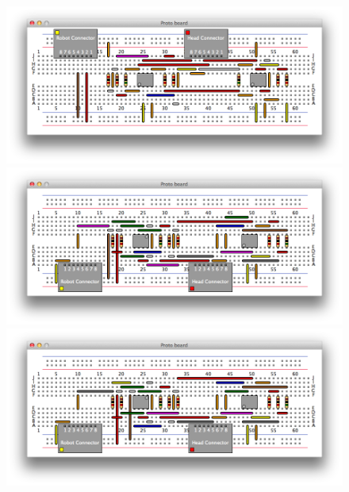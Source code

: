 \begin{figure}
\begin{center}
\includegraphics[width=\textwidth]{Images/exemplar_all_pairs.png}
\includegraphics[width=\textwidth]{Images/exemplar_per_node_increasing.png}
\includegraphics[width=\textwidth]{Images/exemplar_per_node_decreasing.png}
\end{center}
\end{figure}
